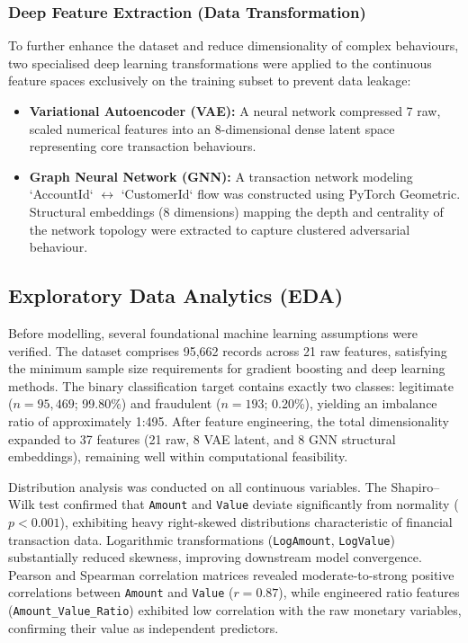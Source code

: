 \documentclass[a4paper,fleqn]{cas-sc}
\begin{document}
\subsubsection{Deep Feature Extraction (Data Transformation)}
To further enhance the dataset and reduce dimensionality of complex behaviours, two specialised deep learning transformations were applied to the continuous feature spaces exclusively on the training subset to prevent data leakage:
\begin{itemize}
    \item \textbf{Variational Autoencoder (VAE):} A neural network compressed 7 raw, scaled numerical features into an 8-dimensional dense latent space representing core transaction behaviours.
    \item \textbf{Graph Neural Network (GNN):} A transaction network modeling `AccountId` $\leftrightarrow$ `CustomerId` flow was constructed using PyTorch Geometric. Structural embeddings (8 dimensions) mapping the depth and centrality of the network topology were extracted to capture clustered adversarial behaviour.
\end{itemize}

\subsection{Exploratory Data Analytics (EDA)}

Before modelling, several foundational machine learning assumptions were verified. The dataset comprises 95,662 records across 21 raw features, satisfying the minimum sample size requirements for gradient boosting and deep learning methods. The binary classification target contains exactly two classes: legitimate ($n = 95{,}469$; 99.80\%) and fraudulent ($n = 193$; 0.20\%), yielding an imbalance ratio of approximately 1:495. After feature engineering, the total dimensionality expanded to 37 features (21 raw, 8 VAE latent, and 8 GNN structural embeddings), remaining well within computational feasibility.

Distribution analysis was conducted on all continuous variables. The Shapiro--Wilk test confirmed that \texttt{Amount} and \texttt{Value} deviate significantly from normality ($p < 0.001$), exhibiting heavy right-skewed distributions characteristic of financial transaction data. Logarithmic transformations (\texttt{LogAmount}, \texttt{LogValue}) substantially reduced skewness, improving downstream model convergence. Pearson and Spearman correlation matrices revealed moderate-to-strong positive correlations between \texttt{Amount} and \texttt{Value} ($r = 0.87$), while engineered ratio features (\texttt{Amount\_Value\_Ratio}) exhibited low correlation with the raw monetary variables, confirming their value as independent predictors.
\end{document}
